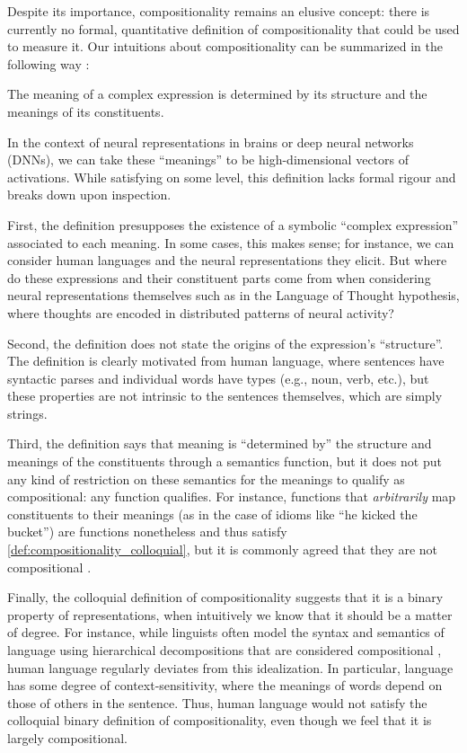 \documentclass{article}
\begin{document}
Despite its importance, compositionality remains an elusive concept: there is currently no formal, quantitative definition of compositionality that could be used to measure it. Our intuitions about compositionality can be summarized in the following way \citep{sep-compositionality}:

\begin{definition}
    \label{def:compositionality_colloquial}
    The meaning of a complex expression is determined by its structure and the meanings of its constituents.
\end{definition}

In the context of neural representations in brains or deep neural networks (DNNs), we can take these ``meanings'' to be high-dimensional vectors of activations. While satisfying on some level, this definition lacks formal rigour and breaks down upon inspection.

First, the definition presupposes the existence of a symbolic ``complex expression'' associated to each meaning. In some cases, this makes sense; for instance, we can consider human languages and the neural representations they elicit. But where do these expressions and their constituent parts come from when considering neural representations themselves such as in the Language of Thought hypothesis, where thoughts are encoded in distributed patterns of neural activity?

Second, the definition does not state the origins of the expression's ``structure''. The definition is clearly motivated from human language, where sentences have syntactic parses and individual words have types (e.g., noun, verb, etc.), but these properties are not intrinsic to the sentences themselves, which are simply strings.

Third, the definition says that meaning is ``determined by'' the structure and meanings of the constituents through a semantics function, but it does not put any kind of restriction on these semantics for the meanings to qualify as compositional: any function qualifies. For instance, functions that \emph{arbitrarily} map constituents to their meanings (as in the case of idioms like ``he kicked the bucket'') are functions nonetheless and thus satisfy \cref{def:compositionality_colloquial}, but it is commonly agreed that they are not compositional \citep{weinreich1969problems,mabruroh2015analysis,swinney1979access}.

Finally, the colloquial definition of compositionality suggests that it is a binary property of representations, when intuitively we know that it should be a matter of degree. For instance, while linguists often model the syntax and semantics of language using hierarchical decompositions that are considered compositional \citep{chomsky1956three}, human language regularly deviates from this idealization. In particular, language has some degree of context-sensitivity, where the meanings of words depend on those of others in the sentence. Thus, human language would not satisfy the colloquial binary definition of compositionality, even though we feel that it is largely compositional.
\end{document}
